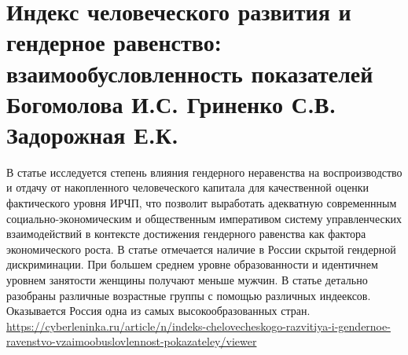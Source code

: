 \documentclass[a4paper,14pt]{article}
\begin{document}
\section{Индекс человеческого развития и гендерное равенство: взаимообусловленность показателей Богомолова И.С. Гриненко С.В. Задорожная Е.К.}
В статье исследуется степень влияния гендерного неравенства на воспроизводство и отдачу от накопленного человеческого капитала для качественной оценки фактического уровня ИРЧП, что позволит выработать адекватную современнным социально-экономическим и общественным императивом систему управленческих взаимодействий в контексте достижения гендерного равенства как фактора экономического роста. В статье отмечается наличие в России скрытой гендерной дискриминации. При большем среднем уровне образованности и идентичнем уровнем занятости женщины получают меньше мужчин. В статье детально разобраны различные возрастные группы с помощью различных индеексов. Оказывается Россия одна из самых высокообразованных стран.
\url{https://cyberleninka.ru/article/n/indeks-chelovecheskogo-razvitiya-i-gendernoe-ravenstvo-vzaimoobuslovlennost-pokazateley/viewer}
\end{document}
